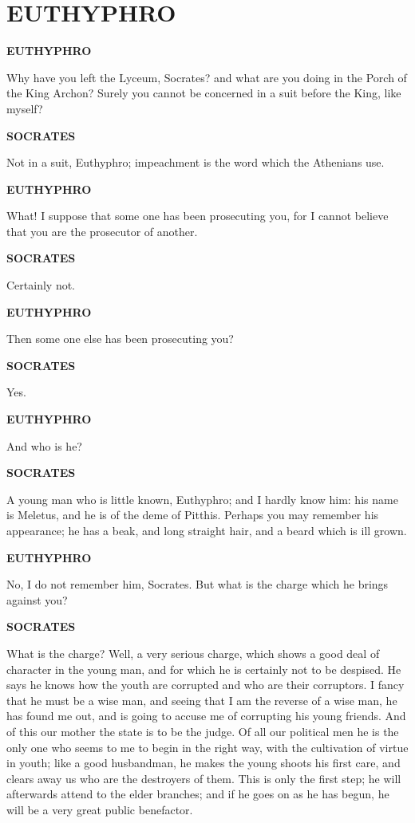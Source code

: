 \documentclass[11pt,letter]{article}
\begin{document}
\section{
      EUTHYPHRO
    }  
\par \textbf{EUTHYPHRO}
\par   Why have you left the Lyceum, Socrates? and what are you doing in the Porch of the King Archon? Surely you cannot be concerned in a suit before the King, like myself?

\par \textbf{SOCRATES}
\par   Not in a suit, Euthyphro; impeachment is the word which the Athenians use.

\par \textbf{EUTHYPHRO}
\par   What! I suppose that some one has been prosecuting you, for I cannot believe that you are the prosecutor of another.

\par \textbf{SOCRATES}
\par   Certainly not.

\par \textbf{EUTHYPHRO}
\par   Then some one else has been prosecuting you?

\par \textbf{SOCRATES}
\par   Yes.

\par \textbf{EUTHYPHRO}
\par   And who is he?

\par \textbf{SOCRATES}
\par   A young man who is little known, Euthyphro; and I hardly know him:  his name is Meletus, and he is of the deme of Pitthis. Perhaps you may remember his appearance; he has a beak, and long straight hair, and a beard which is ill grown.

\par \textbf{EUTHYPHRO}
\par   No, I do not remember him, Socrates. But what is the charge which he brings against you?

\par \textbf{SOCRATES}
\par   What is the charge? Well, a very serious charge, which shows a good deal of character in the young man, and for which he is certainly not to be despised. He says he knows how the youth are corrupted and who are their corruptors. I fancy that he must be a wise man, and seeing that I am the reverse of a wise man, he has found me out, and is going to accuse me of corrupting his young friends. And of this our mother the state is to be the judge. Of all our political men he is the only one who seems to me to begin in the right way, with the cultivation of virtue in youth; like a good husbandman, he makes the young shoots his first care, and clears away us who are the destroyers of them. This is only the first step; he will afterwards attend to the elder branches; and if he goes on as he has begun, he will be a very great public benefactor.
\end{document}
